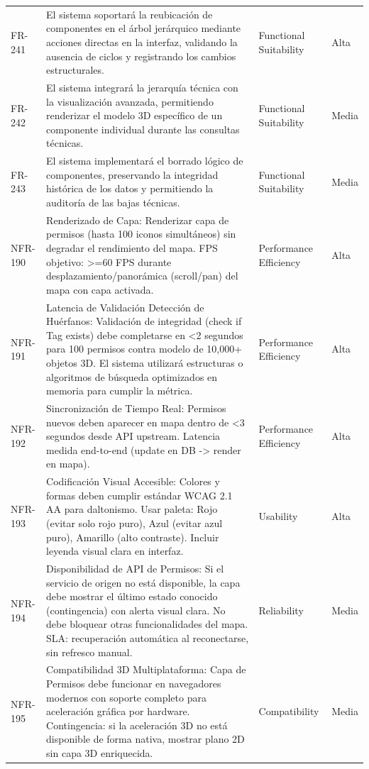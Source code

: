 \begin{longtable}{>{\raggedright\arraybackslash}p{} >{\raggedright\arraybackslash}p{} >{\raggedright\arraybackslash}p{} >{\raggedright\arraybackslash}p{}}
FR-241 & El sistema soportará la reubicación de componentes en el árbol jerárquico mediante acciones directas en la interfaz, validando la ausencia de ciclos y registrando los cambios estructurales. & Functional Suitability & Alta \\
FR-242 & El sistema integrará la jerarquía técnica con la visualización avanzada, permitiendo renderizar el modelo 3D específico de un componente individual durante las consultas técnicas. & Functional Suitability & Media \\
FR-243 & El sistema implementará el borrado lógico de componentes, preservando la integridad histórica de los datos y permitiendo la auditoría de las bajas técnicas. & Functional Suitability & Media \\
NFR-190 & Renderizado de Capa: Renderizar capa de permisos (hasta 100 iconos simultáneos) sin degradar el rendimiento del mapa. FPS objetivo: >=60 FPS durante desplazamiento/panorámica (scroll/pan) del mapa con capa activada. & Performance Efficiency & Alta \\
NFR-191 & Latencia de Validación Detección de Huérfanos: Validación de integridad (check if Tag exists) debe completarse en <2 segundos para 100 permisos contra modelo de 10,000+ objetos 3D. El sistema utilizará estructuras o algoritmos de búsqueda optimizados en memoria para cumplir la métrica. & Performance Efficiency & Alta \\
NFR-192 & Sincronización de Tiempo Real: Permisos nuevos deben aparecer en mapa dentro de <3 segundos desde API upstream. Latencia medida end-to-end (update en DB -> render en mapa). & Performance Efficiency & Alta \\
NFR-193 & Codificación Visual Accesible: Colores y formas deben cumplir estándar WCAG 2.1 AA para daltonismo. Usar paleta: Rojo (evitar solo rojo puro), Azul (evitar azul puro), Amarillo (alto contraste). Incluir leyenda visual clara en interfaz. & Usability & Alta \\
NFR-194 & Disponibilidad de API de Permisos: Si el servicio de origen no está disponible, la capa debe mostrar el último estado conocido (contingencia) con alerta visual clara. No debe bloquear otras funcionalidades del mapa. SLA: recuperación automática al reconectarse, sin refresco manual. & Reliability & Media \\
NFR-195 & Compatibilidad 3D Multiplataforma: Capa de Permisos debe funcionar en navegadores modernos con soporte completo para aceleración gráfica por hardware. Contingencia: si la aceleración 3D no está disponible de forma nativa, mostrar plano 2D sin capa 3D enriquecida. & Compatibility & Media \\

\end{longtable}
